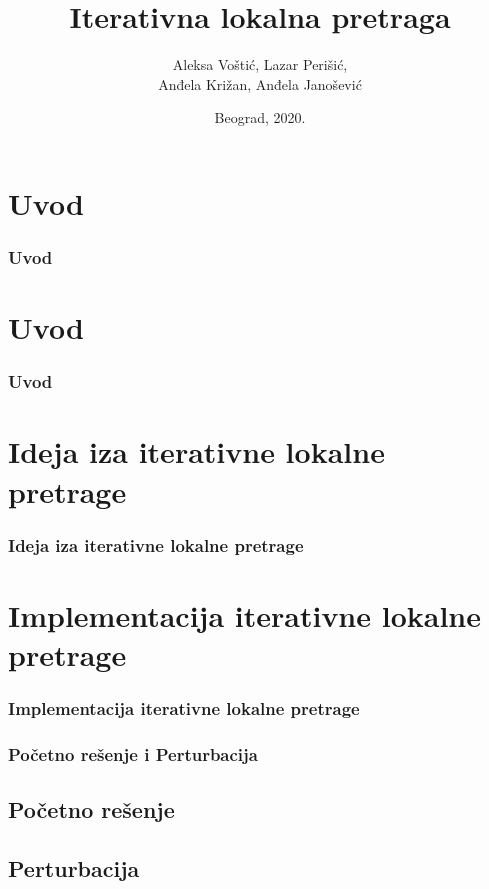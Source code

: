 \documentclass{beamer}
\begin{document}
\title{Iterativna lokalna pretraga}
\author[]{Aleksa Voštić, Lazar Perišić,\\ Anđela Križan, Anđela Janošević}
\date{
	\footnotesize{Beograd, 2020.}	
}

\begin{frame}
	\thispagestyle{empty}
	\titlepage
\end{frame}


\section*{Uvod}
\begin{frame}[fragile]
    \frametitle{Uvod}

\end{frame}
\section*{Uvod}
\begin{frame}[fragile]
    \frametitle{Uvod}

\end{frame}

\section{Ideja iza iterativne lokalne pretrage}
\begin{frame}
	\frametitle{Ideja iza iterativne lokalne pretrage} 

\end{frame}

\section{Implementacija iterativne lokalne pretrage}
\begin{frame}[fragile]\frametitle{Implementacija iterativne lokalne pretrage}
 
\end{frame}

\begin{frame}[fragile]\frametitle{Početno rešenje i Perturbacija}
	\subsection{Početno rešenje}
	\subsection{Perturbacija}

\end{frame}
\end{document}
